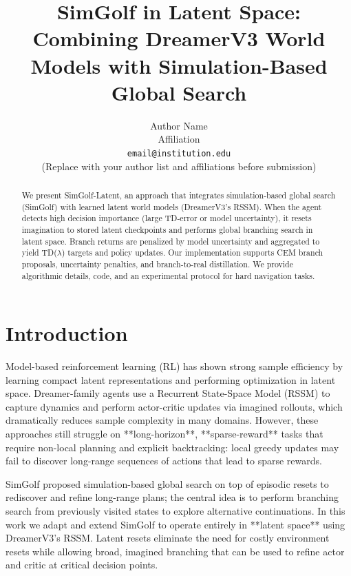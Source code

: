 \documentclass{article}
\title{SimGolf in Latent Space: Combining DreamerV3 World Models with Simulation-Based Global Search}
\author{Author Name \\
Affiliation \\
\texttt{email@institution.edu} \\
(Replace with your author list and affiliations before submission)}
\date{}
\begin{document}
\maketitle

\begin{abstract}
We present SimGolf-Latent, an approach that integrates simulation-based global
search (SimGolf) with learned latent world models (DreamerV3's RSSM). When the
agent detects high decision importance (large TD-error or model uncertainty),
it resets imagination to stored latent checkpoints and performs global branching
search in latent space. Branch returns are penalized by model uncertainty and
aggregated to yield TD(\(\lambda\)) targets and policy updates. Our
implementation supports CEM branch proposals, uncertainty penalties, and
branch-to-real distillation. We provide algorithmic details, code, and an
experimental protocol for hard navigation tasks.
\end{abstract}

\section{Introduction}
Model-based reinforcement learning (RL) has shown strong sample efficiency by
learning compact latent representations and performing optimization in latent
space. Dreamer-family agents use a Recurrent State-Space Model (RSSM) to
capture dynamics and perform actor-critic updates via imagined rollouts, which
dramatically reduces sample complexity in many domains. However, these
approaches still struggle on **long-horizon**, **sparse-reward** tasks that
require non-local planning and explicit backtracking: local greedy updates may
fail to discover long-range sequences of actions that lead to sparse rewards.

SimGolf \cite{sim_golf} proposed simulation-based global search on top of
episodic resets to rediscover and refine long-range plans; the central idea is
to perform branching search from previously visited states to explore
alternative continuations. In this work we adapt and extend SimGolf to operate
entirely in **latent space** using DreamerV3's RSSM. Latent resets eliminate
the need for costly environment resets while allowing broad, imagined
branching that can be used to refine actor and critic at critical decision
points.
\end{document}
